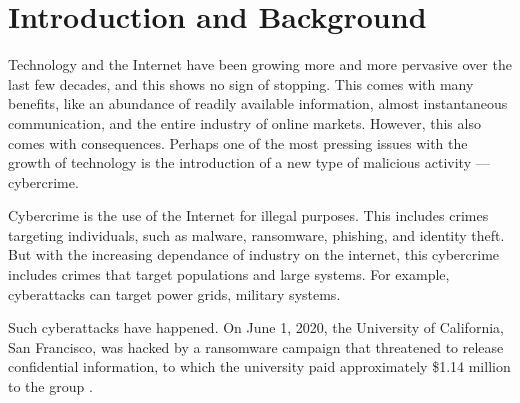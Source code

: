 \section{Introduction and Background}
Technology and the Internet have been growing more and more pervasive over the last few decades, and this shows no sign of stopping.
This comes with many benefits, like an abundance of readily available information, almost instantaneous communication, and the entire industry of online markets.
However, this also comes with consequences.
Perhaps one of the most pressing issues with the growth of technology is the introduction of a new type of malicious activity --- cybercrime.

Cybercrime is the use of the Internet for illegal purposes.
This includes crimes targeting individuals, such as malware, ransomware, phishing, and identity theft.
But with the increasing dependance of industry on the internet, this cybercrime includes crimes that target populations and large systems.
For example, cyberattacks can target power grids, military systems.

Such cyberattacks have happened.
On June 1, 2020, the University of California, San Francisco, was hacked by a ransomware campaign that threatened to release confidential information, to which the university paid approximately \$1.14 million to the group \cite{winder2020}.